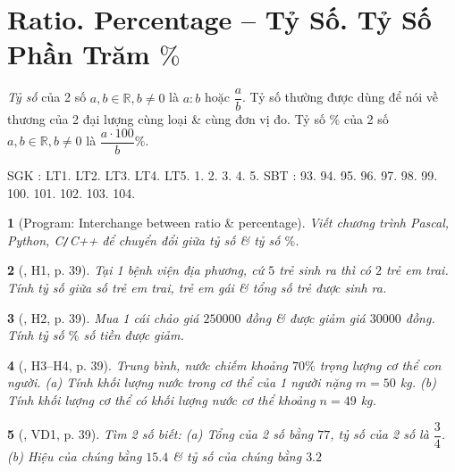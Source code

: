 \documentclass{article}
\newtheorem{baitoan}{}
\begin{document}

\section{Ratio. Percentage -- Tỷ Số. Tỷ Số Phần Trăm $\%$}
 \textit{Tỷ số} của 2 số $a,b\in\mathbb{R},b\ne0$ là $a:b$ hoặc $\dfrac{a}{b}$.  Tỷ số thường được dùng để nói về thương của 2 đại lượng cùng loại \& cùng đơn vị đo.  Tỷ số $\%$ của 2 số $a,b\in\mathbb{R},b\ne0$ là  $\dfrac{a\cdot100}{b}\%$.

\noindent SGK \cite[Chap. V, \S9, pp. 61--66]{SGK_Toan_6_Canh_Dieu_tap_2}: LT1. LT2. LT3. LT4. LT5. 1. 2. 3. 4. 5. SBT \cite[Chap. V, \S9, pp. 54--56]{SBT_Toan_6_Canh_Dieu_tap_2}: 93. 94. 95. 96. 97. 98. 99. 100. 101. 102. 103. 104.

\begin{baitoan}[{\sf Program}: Interchange between ratio \& percentage]
	Viết chương trình {\sf Pascal, Python, C{\tt/}C++} để chuyển đổi giữa tỷ số \& tỷ số $\%$.
\end{baitoan}

\begin{baitoan}[\cite{Binh_boi_duong_Toan_6_tap_2}, H1, p. 39]
	Tại 1 bệnh viện địa phương, cứ $5$ trẻ sinh ra thì có $2$ trẻ em trai. Tính tỷ số giữa số trẻ em trai, trẻ em gái \& tổng số trẻ được sinh ra.
\end{baitoan}

\begin{baitoan}[\cite{Binh_boi_duong_Toan_6_tap_2}, H2, p. 39]
	Mua 1 cái chảo giá $250000$ đồng \& được giảm giá $30000$ đồng. Tính tỷ số $\%$ số tiền được giảm.
\end{baitoan}

\begin{baitoan}[\cite{Binh_boi_duong_Toan_6_tap_2}, H3--H4, p. 39]
	Trung bình, nước chiếm khoảng $70\%$ trọng lượng cơ thể con người. (a) Tính khối lượng nước trong cơ thể của 1 người nặng $m = 50$ {\rm kg}. (b) Tính khối lượng cơ thể có khối lượng nước cơ thể khoảng $n = 49$ {\rm kg}.
\end{baitoan}

\begin{baitoan}[\cite{Binh_boi_duong_Toan_6_tap_2}, VD1, p. 39]
	Tìm 2 số biết: (a) Tổng của 2 số bằng $77$, tỷ số của 2 số là $\dfrac{3}{4}$. (b) Hiệu của chúng bằng $15.4$ \& tỷ số của chúng bằng $3.2$
\end{baitoan}
\end{document}
